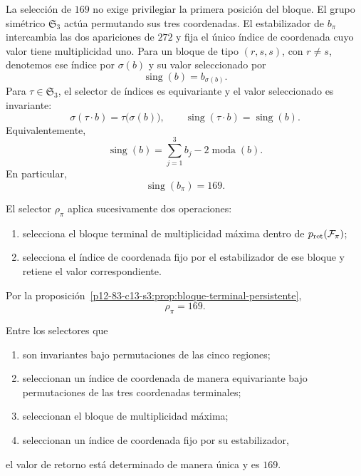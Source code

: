 La selección de \(169\) no exige privilegiar la primera posición del bloque.
El grupo simétrico \(\mathfrak S_3\) actúa permutando sus tres coordenadas.
El estabilizador de \(b_\pi\) intercambia las dos apariciones de \(272\) y
fija el único índice de coordenada cuyo valor tiene multiplicidad uno.
Para un bloque de tipo \((r,s,s)\), con \(r\ne s\), denotemos ese índice
por \(\sigma(b)\) y su valor seleccionado por
\[
 \operatorname{sing}(b)=b_{\sigma(b)}.
\]
Para \(\tau\in\mathfrak S_3\), el selector de índices es equivariante
y el valor seleccionado es invariante:
\[
 \sigma(\tau\cdot b)=\tau\bigl(\sigma(b)\bigr),\qquad
 \operatorname{sing}(\tau\cdot b)=\operatorname{sing}(b).
\]
Equivalentemente,
\[
\operatorname{sing}(b)
=\sum_{j=1}^3b_j-2\operatorname{moda}(b).
\]
En particular,
\[
\boxed{\operatorname{sing}(b_\pi)=169.}
\]

\begin{definition}
\label{p12-83-c13-s3:def:selector-residual-pi}
El selector \(\rho_\pi\) aplica sucesivamente dos operaciones:
\begin{enumerate}
  \item selecciona el bloque terminal de multiplicidad máxima dentro de
  \(p_{\rm ret}(\mathcal F_\pi)\);
  \item selecciona el índice de coordenada fijo por el estabilizador de
  ese bloque y retiene el valor correspondiente.
\end{enumerate}
Por la proposición~\ref{p12-83-c13-s3:prop:bloque-terminal-persistente},
\[
\boxed{\rho_\pi=169.}
\]
\end{definition}

\begin{theorem}
\label{p12-83-c13-s3:thm:unicidad-retorno-169}
Entre los selectores que
\begin{enumerate}
  \item son invariantes bajo permutaciones de las cinco regiones;
  \item seleccionan un índice de coordenada de manera equivariante bajo
  permutaciones de las tres coordenadas terminales;
  \item seleccionan el bloque de multiplicidad máxima;
  \item seleccionan un índice de coordenada fijo por su estabilizador,
\end{enumerate}
el valor de retorno está determinado de manera única y es \(169\).
\end{theorem}


